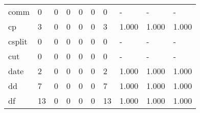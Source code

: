 \begin{longtable}{lp{2.0cm}p{2.0cm}p{2.0cm}p{2.0cm}p{2.0cm}p{2.0cm}p{2.0cm}p{2.0cm}p{2.0cm}}
comm      &                      0 &                                             0 &                                            0 &                                           0 &                                            0 &                                          0 &                                    - &                                      - &                                    - \\
cp        &                      3 &                                             0 &                                            0 &                                           0 &                                            0 &                                          3 &                                1.000 &                                  1.000 &                                1.000 \\
csplit    &                      0 &                                             0 &                                            0 &                                           0 &                                            0 &                                          0 &                                    - &                                      - &                                    - \\
cut       &                      0 &                                             0 &                                            0 &                                           0 &                                            0 &                                          0 &                                    - &                                      - &                                    - \\
date      &                      2 &                                             0 &                                            0 &                                           0 &                                            0 &                                          2 &                                1.000 &                                  1.000 &                                1.000 \\
dd        &                      7 &                                             0 &                                            0 &                                           0 &                                            0 &                                          7 &                                1.000 &                                  1.000 &                                1.000 \\
df        &                     13 &                                             0 &                                            0 &                                           0 &                                            0 &                                         13 &                                1.000 &                                  1.000 &                                1.000 \\

\end{longtable}
